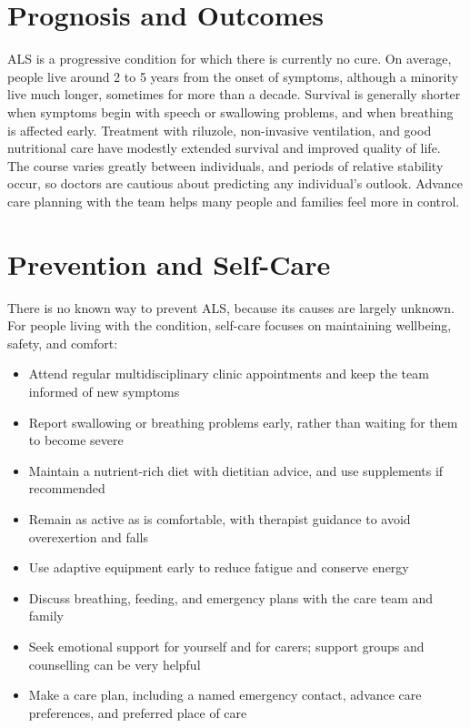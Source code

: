 \section*{Prognosis and Outcomes}
ALS is a progressive condition for which there is currently no cure. On average, people live around 2 to 5 years from the onset of symptoms, although a minority live much longer, sometimes for more than a decade. Survival is generally shorter when symptoms begin with speech or swallowing problems, and when breathing is affected early. Treatment with riluzole, non-invasive ventilation, and good nutritional care have modestly extended survival and improved quality of life. The course varies greatly between individuals, and periods of relative stability occur, so doctors are cautious about predicting any individual's outlook. Advance care planning with the team helps many people and families feel more in control.

\section*{Prevention and Self-Care}
There is no known way to prevent ALS, because its causes are largely unknown. For people living with the condition, self-care focuses on maintaining wellbeing, safety, and comfort:
\begin{itemize}
    \item Attend regular multidisciplinary clinic appointments and keep the team informed of new symptoms
    \item Report swallowing or breathing problems early, rather than waiting for them to become severe
    \item Maintain a nutrient-rich diet with dietitian advice, and use supplements if recommended
    \item Remain as active as is comfortable, with therapist guidance to avoid overexertion and falls
    \item Use adaptive equipment early to reduce fatigue and conserve energy
    \item Discuss breathing, feeding, and emergency plans with the care team and family
    \item Seek emotional support for yourself and for carers; support groups and counselling can be very helpful
    \item Make a care plan, including a named emergency contact, advance care preferences, and preferred place of care
\end{itemize}

